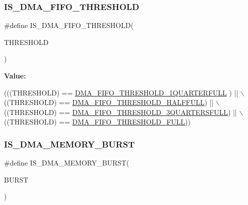 \subsubsection{\texorpdfstring{I\+S\+\_\+\+D\+M\+A\+\_\+\+F\+I\+F\+O\+\_\+\+T\+H\+R\+E\+S\+H\+O\+LD}{IS\_DMA\_FIFO\_THRESHOLD}}
{\footnotesize\ttfamily \#define I\+S\+\_\+\+D\+M\+A\+\_\+\+F\+I\+F\+O\+\_\+\+T\+H\+R\+E\+S\+H\+O\+LD(\begin{DoxyParamCaption}\item[{}]{T\+H\+R\+E\+S\+H\+O\+LD }\end{DoxyParamCaption})}

{\bfseries Value\+:}
\begin{DoxyCode}
(((THRESHOLD) == \mbox{\hyperlink{group___d_m_a___f_i_f_o__threshold__level_ga4debbd5733190b61b2115613d4b3658b}{DMA\_FIFO\_THRESHOLD\_1QUARTERFULL}} ) || \(\backslash\)
                                          ((THRESHOLD) == 
      \mbox{\hyperlink{group___d_m_a___f_i_f_o__threshold__level_gad2b071aa3a3bfc936017f12fb956c56f}{DMA\_FIFO\_THRESHOLD\_HALFFULL}})      || \(\backslash\)
                                          ((THRESHOLD) == 
      \mbox{\hyperlink{group___d_m_a___f_i_f_o__threshold__level_gae1e4ba12bae8440421e6672795d71223}{DMA\_FIFO\_THRESHOLD\_3QUARTERSFULL}}) || \(\backslash\)
                                          ((THRESHOLD) == 
      \mbox{\hyperlink{group___d_m_a___f_i_f_o__threshold__level_ga5de463bb24dc12fe7bbb300e1e4493f7}{DMA\_FIFO\_THRESHOLD\_FULL}}))
\end{DoxyCode}
\mbox{\label{group___d_m_a___private___macros_ga921ebf06447dc036180fff50b7e4846a}} 
\subsubsection{\texorpdfstring{I\+S\+\_\+\+D\+M\+A\+\_\+\+M\+E\+M\+O\+R\+Y\+\_\+\+B\+U\+R\+ST}{IS\_DMA\_MEMORY\_BURST}}
{\footnotesize\ttfamily \#define I\+S\+\_\+\+D\+M\+A\+\_\+\+M\+E\+M\+O\+R\+Y\+\_\+\+B\+U\+R\+ST(\begin{DoxyParamCaption}\item[{}]{B\+U\+R\+ST }\end{DoxyParamCaption})}

